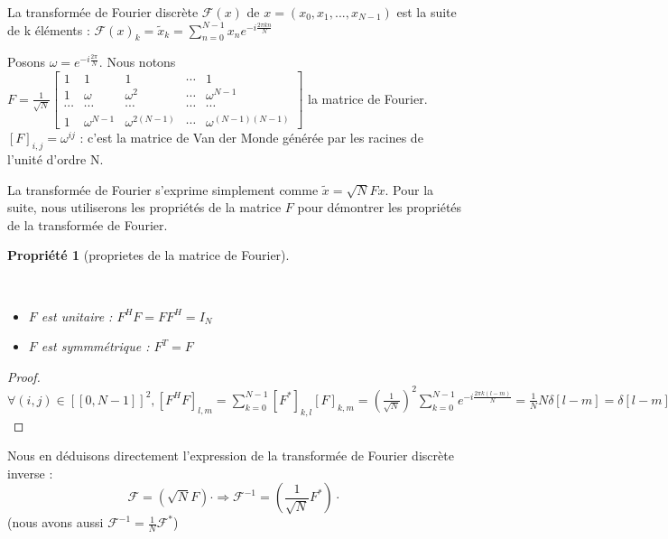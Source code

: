 \documentclass[11pt,oneside]{article}
\newtheorem{property}[theorem]{Propriété}
\begin{document}
\begin{tcolorbox}[colback=yellow!10!white,colframe=black!75!black,title=Definition: transformée de Fourier discrète]
    La transformée de Fourier discrète $\mathcal{F}(x)$ de $x = (x_0, x_1, ..., x_{N-1})$ est la suite de k éléments :
    $\mathcal{F}(x)_k = \tilde x_k = \sum_{n=0}^{N-1} x_n e^{-i\frac{2 \pi k n}{N}}$
\end{tcolorbox}

Posons $\omega = e^{- i \frac{2\pi}{N}}$.
Nous notons
$F = \frac{1}{\sqrt{N}}\begin{bmatrix}  
1 & 1 & 1 & \cdots & 1\\
1 & \omega & \omega^{2} & \cdots & \omega^{N-1}\\
\cdots & \cdots & \cdots & \cdots & \cdots\\
1 & \omega^{N-1} & \omega^{2(N-1)}& \cdots& \omega^{(N-1)(N-1)} 
\end{bmatrix}$ la matrice de Fourier. $[F]_{i,j} = \omega^{ij}$ : c'est la matrice de Van der Monde générée par les racines de l'unité d'ordre N.

La transformée de Fourier s'exprime simplement comme $\tilde x = \sqrt{N} F x$. Pour la suite, nous utiliserons les propriétés de la matrice $F$ pour démontrer les propriétés de la transformée de Fourier.

\begin{property}[proprietes de la matrice de Fourier]
\label{prop:matrice_Fourier}

\\

\begin{itemize}
    \item $F$ est unitaire : $F^H F = F F^H = I_N$
    \item $F$ est symmmétrique : $F^T = F$
\end{itemize}



\end{property}

\begin{proof}
    $\forall (i,j) \in [\![0,N-1]\!]^2,  [F^H F]_{l,m} = \sum_{k=0}^{N-1} [F^*]_{k,l} [F]_{k,m} = (\frac{1}{\sqrt{N}})^2 \sum_{k=0}^{N-1} e^{- i \frac{2 \pi k (l-m)}{N}} = \frac{1}{N} N \delta [l-m] = \delta [l-m] $
\end{proof}




Nous en déduisons directement l'expression de la transformée de Fourier discrète inverse : 
$$ \mathcal{F} = (\sqrt{N} F) \cdot \Rightarrow \mathcal{F}^{-1} = (\frac{1}{\sqrt{N}} {F^*}) \cdot $$ 
(nous avons aussi $\mathcal{F}^{-1} = \frac{1}{N} \mathcal{F}^*$)
\end{document}
